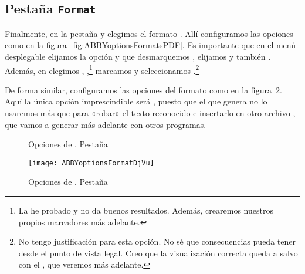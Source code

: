 \documentclass[%
	a5paper,
	10pt,
	twoside,
	openright,
	final,
]{memoir}
\begin{document}
	\subsection{Pestaña \texttt{Format}} Finalmente, en la pestaña  y elegimos el formato . Allí configuramos las opciones como en la figura~\ref{fig:ABBYoptionsFormatsPDF}. Es importante que en el menú desplegable  elijamos la opción  y que desmarquemos , elijamos  y también . Además, en  elegimos , ,\footnote{La he probado y no da buenos resultados. Además, crearemos nuestros propios marcadores más adelante.} marcamos  y seleccionamos .\footnote{No tengo justificación para esta opción. No sé que consecuencias pueda tener desde el punto de vista legal. Creo que la visualización correcta queda a salvo con el \pdfa, que veremos más adelante.}

	De forma similar, configuramos las opciones del formato \djvu como en la figura~\ref{fig:ABBYoptionsFormatDjVu}. Aquí la única opción imprescindible será , puesto que el \djvu que genera \abby no lo usaremos más que para «robar» el texto reconocido e insertarlo en otro archivo \djvu, que vamos a generar más adelante con otros programas.

	\begin{figure}
		\vspace{-20pt}
		\centering
		\caption[Opciones de \abby. Pestaña Format Settings >\ PDF]{Opciones de \abby. Pestaña \label{fig:ABBYoptionsFormatPDF}}
	\end{figure}

	\begin{figure}
		\texttt{[image: ABBYoptionsFormatDjVu]}
		\caption[Opciones de \abby. Pestaña Format Settings >\ DjVu]{Opciones de \abby. Pestaña \label{fig:ABBYoptionsFormatDjVu}}
	\end{figure}
\end{document}
